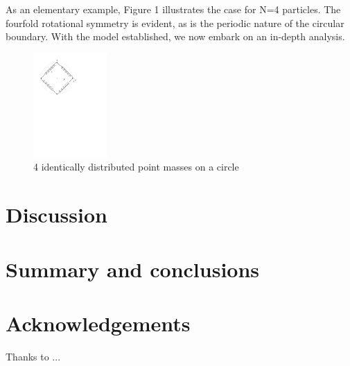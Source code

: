 \documentclass[final,5p,times,twocolumn,authoryear]{elsarticle}
\begin{document}
As an elementary example, Figure 1 illustrates the case for N=4 particles. The fourfold rotational symmetry is evident, as is the periodic nature of the circular boundary. With the model established, we now embark on an in-depth analysis.

\begin{figure}
	\centering 
	\includegraphics[width=0.25\textwidth]{../Figures/1D-4Particle-Springs.pdf}	
	\caption{4 identically distributed point masses on a circle} 
	\label{fig-n4}
\end{figure}




\section{Discussion}

\section{Summary and conclusions}


\section*{Acknowledgements}
Thanks to ...


 







\end{document}
